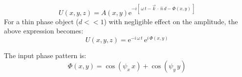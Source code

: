 \begin{equation}
U(x,y,z) = A(x,y)\mathrm{e}^{-i\left[\,\omega \, t - \vec{k} \,\cdot \,\hat{n} \, d - \Phi(x,y)\,\right]} 
\end{equation}
For a thin phase object ($d<<1$) with negligible effect on the amplitude, the above expression becomes:
\begin{equation}
U(x,y,z) =\mathrm{e}^{-i\,\omega \, t} \, \mathrm{e}^{i\,\Phi(x,y)} 
\end{equation}

The input phase pattern is:
\begin{equation}
\Phi(x,y) = \cos(\psi_x \, x) + \cos(\psi_y \, y) 
\end{equation}



